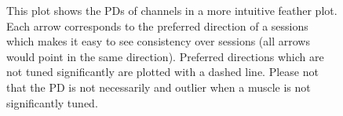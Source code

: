 \begin{figure}[ht]
    \centering
    \caption{This plot shows the PDs of channels in a more intuitive feather plot. Each arrow corresponds to the preferred direction of a sessions which makes it easy to see consistency over sessions (all arrows would point in the same direction). Preferred directions which are not tuned significantly are plotted with a dashed line. Please not that the PD is not necessarily and outlier when a muscle is not significantly tuned.}
    \label{sg:fig:pd_featherplots}
\end{figure}
\clearpage


